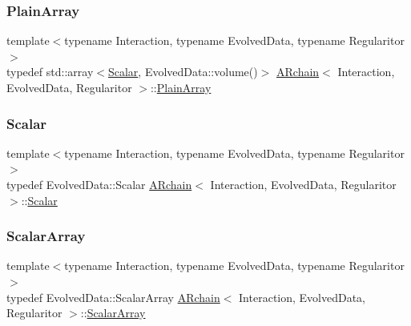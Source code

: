 \mbox{\label{class_a_rchain_a829aca51411c08ffd518294770a374d5}} 
\subsubsection{\texorpdfstring{Plain\+Array}{PlainArray}}
{\footnotesize\ttfamily template$<$typename Interaction, typename Evolved\+Data, typename Regularitor$>$ \\
typedef std\+::array$<$\mbox{\hyperlink{class_a_rchain_a707e42a79e4744424a34c9007e84ee07}{Scalar}}, Evolved\+Data\+::volume()$>$ \mbox{\hyperlink{class_a_rchain}{A\+Rchain}}$<$ Interaction, Evolved\+Data, Regularitor $>$\+::\mbox{\hyperlink{class_a_rchain_a829aca51411c08ffd518294770a374d5}{Plain\+Array}}}

\mbox{\label{class_a_rchain_a707e42a79e4744424a34c9007e84ee07}} 
\subsubsection{\texorpdfstring{Scalar}{Scalar}}
{\footnotesize\ttfamily template$<$typename Interaction, typename Evolved\+Data, typename Regularitor$>$ \\
typedef Evolved\+Data\+::\+Scalar \mbox{\hyperlink{class_a_rchain}{A\+Rchain}}$<$ Interaction, Evolved\+Data, Regularitor $>$\+::\mbox{\hyperlink{class_a_rchain_a707e42a79e4744424a34c9007e84ee07}{Scalar}}}

\mbox{\label{class_a_rchain_a206c7f2ff7ce15041a20d327d28b7be3}} 
\subsubsection{\texorpdfstring{Scalar\+Array}{ScalarArray}}
{\footnotesize\ttfamily template$<$typename Interaction, typename Evolved\+Data, typename Regularitor$>$ \\
typedef Evolved\+Data\+::\+Scalar\+Array \mbox{\hyperlink{class_a_rchain}{A\+Rchain}}$<$ Interaction, Evolved\+Data, Regularitor $>$\+::\mbox{\hyperlink{class_a_rchain_a206c7f2ff7ce15041a20d327d28b7be3}{Scalar\+Array}}}

